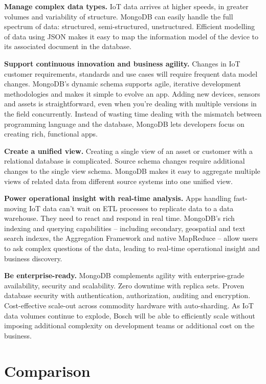 \documentclass[9pt,twocolumn,twoside]{styles/osajnl}
\begin{document}
{\bfseries Manage complex data types.} IoT data arrives at higher speeds, in greater volumes and variability of structure. MongoDB can easily handle the full spectrum of data: structured, semi-structured, unstructured. Efficient modelling of data using JSON makes it easy to map the information model of the device to its associated document in the database.

{\bfseries Support continuous innovation and business agility.} Changes in IoT customer requirements, standards and use cases will require frequent data model changes. MongoDB’s dynamic schema supports agile, iterative development methodologies and makes it simple to evolve an app. Adding new devices, sensors and assets is straightforward, even when you’re dealing with multiple versions in the field concurrently. Instead of wasting time dealing with the mismatch between programming language and the database, MongoDB lets developers focus on creating rich, functional apps.

{\bfseries Create a unified view.} Creating a single view of an asset or customer with a relational database is complicated. Source schema changes require additional changes to the single view schema. MongoDB makes it easy to aggregate multiple views of related data from different source systems into one unified view.

{\bfseries Power operational insight with real-time analysis.} Apps handling fast-moving IoT data can’t wait on ETL processes to replicate data to a data warehouse. They need to react and respond in real time. MongoDB’s rich indexing and querying capabilities – including secondary, geospatial and text search indexes, the Aggregation Framework and native MapReduce – allow users to ask complex questions of the data, leading to real-time operational insight and business discovery.

{\bfseries Be enterprise-ready.} MongoDB complements agility with enterprise-grade availability, security and scalability. Zero downtime with replica sets. Proven database security with authentication, authorization, auditing and encryption. Cost-effective scale-out across commodity hardware with auto-sharding. As IoT data volumes continue to explode, Bosch will be able to efficiently scale without imposing additional complexity on development teams or additional cost on the business.


\section{Comparison}
\end{document}

